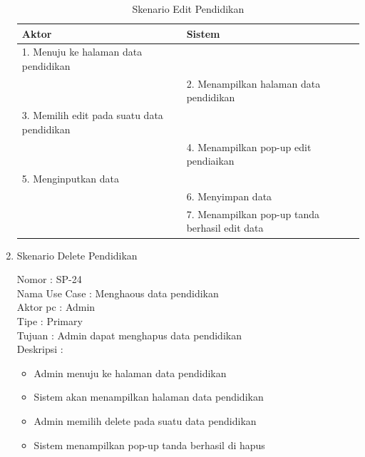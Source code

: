 \begin{enumerate}
\begin{itemize}
\end{itemize}

\begin{table}
	\caption{Skenario Edit Pendidikan}
	\centering
	\begin{tabular}{ | p{55mm} | p{70mm} |}
		\hline 
		\textbf{Aktor} & \textbf{Sistem} \\
		\hline
		
		1.	Menuju ke halaman data pendidikan &  \\
		
		\hline
		
		&  2.	Menampilkan halaman data pendidikan \\
		
		\hline
		
		3. Memilih edit pada suatu data pendidikan & \\
		
		\hline
		
		& 4.	Menampilkan pop-up edit pendiaikan \\
		
		\hline
		
		5.	Menginputkan data  & \\
		\hline
		
		& 6.	Menyimpan data \\
		\hline
		
		& 7.	Menampilkan pop-up tanda berhasil edit data \\
		\hline
		
	\end{tabular}
\end{table}

\item Skenario Delete Pendidikan

Nomor \kern 3.6pc : SP-24 \\
Nama Use Case : Menghaous data pendidikan \\
Aktor  pc : Admin \\
Tipe \kern 4.6pc : Primary \\
Tujuan \kern 3.6pc : Admin dapat menghapus data pendidikan \\
Deskripsi \kern 2.5pc : 

\begin{itemize}
	\item Admin menuju ke halaman data pendidikan
	\item Sistem akan menampilkan halaman data pendidikan
	\item Admin memilih delete pada suatu data pendidikan
	\item Sistem menampilkan pop-up tanda berhasil di hapus
	

\end{itemize}
\end{enumerate}
